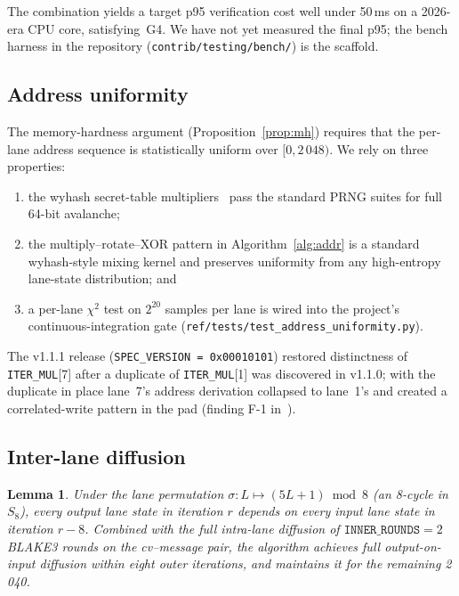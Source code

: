 \documentclass[11pt,a4paper]{article}
\theoremstyle{plain}
\newtheorem{lemma}[theorem]{Lemma}
\theoremstyle{definition}
\theoremstyle{remark}
\begin{document}
The combination yields a target p95 verification cost well under 50\,ms
on a 2026-era CPU core, satisfying~G4. We have not yet measured the
final p95; the bench harness in the repository
(\texttt{contrib/testing/bench/}) is the scaffold.

\subsection{Address uniformity}\label{sec:security-uniformity}

The memory-hardness argument (Proposition~\ref{prop:mh}) requires
that the per-lane address sequence is statistically uniform over
$[0, 2\,048)$. We rely on three properties:

\begin{enumerate}\itemsep0.2em
\item the wyhash secret-table multipliers~\cite{wyhash} pass the
      standard PRNG suites for full 64-bit avalanche;
\item the multiply--rotate--XOR pattern in
      Algorithm~\ref{alg:addr} is a standard wyhash-style mixing
      kernel and preserves uniformity from any high-entropy
      lane-state distribution; and
\item a per-lane $\chi^2$ test on $2^{20}$ samples per lane is wired
      into the project's continuous-integration gate
      (\texttt{ref/tests/test\_address\_uniformity.py}).
\end{enumerate}

The v1.1.1 release (\texttt{SPEC\_VERSION = 0x00010101}) restored
distinctness of \texttt{ITER\_MUL}[7] after a duplicate of
\texttt{ITER\_MUL}[1] was discovered in v1.1.0; with the duplicate
in place lane~7's address derivation collapsed to lane~1's and
created a correlated-write pattern in the pad (finding F-1
in~\cite{b3chain-51attack}).

\subsection{Inter-lane diffusion}\label{sec:security-diff}

\begin{lemma}\label{lem:diffusion}
Under the lane permutation $\sigma\colon L\mapsto (5L+1)\bmod 8$
(an 8-cycle in $S_8$), every output lane state in iteration $r$
depends on every input lane state in iteration $r-8$. Combined
with the full intra-lane diffusion of $\texttt{INNER\_ROUNDS}=2$
BLAKE3 rounds on the cv--message pair, the algorithm achieves full
output-on-input diffusion within eight outer iterations, and
maintains it for the remaining 2\,040.
\end{lemma}
\end{document}
